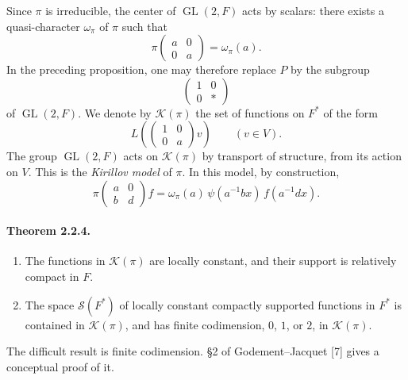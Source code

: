\documentclass[10pt,a4paper]{article}
\providecommand{\GL}{\operatorname{GL}}
\providecommand{\calK}{\mathcal K}
\begin{document}
\clearpage
{}
\hypertarget{authority-26}{}
Since \(\pi\) is irreducible, the center of \(\GL(2,F)\) acts by scalars: there exists a quasi-character \(\omega_\pi\) of \(\pi\) such that
\[
\pi\begin{pmatrix}a&0\\0&a\end{pmatrix}=\omega_\pi(a).
\]
In the preceding proposition, one may therefore replace \(P\) by the subgroup
\[
\begin{pmatrix}1&0\\0&*\end{pmatrix}
\]
of \(\GL(2,F)\). We denote by \(\calK(\pi)\) the set of functions on \(F^*\) of the form
\[
L\!\left(\begin{pmatrix}1&0\\0&a\end{pmatrix}v\right)\qquad (v\in V).
\]
The group \(\GL(2,F)\) acts on \(\calK(\pi)\) by transport of structure, from its action on \(V\). This is the \emph{Kirillov model} of \(\pi\). In this model, by construction,
\[
\tag{2.2.3.1}
\pi\begin{pmatrix}a&0\\b&d\end{pmatrix}f
=
\omega_\pi(a)\,\psi(a^{-1}bx)\,f(a^{-1}dx).
\]

\paragraph{Theorem 2.2.4.}{\itshape 
\begin{enumerate}[label=(\roman*)]
\item The functions in \(\calK(\pi)\) are locally constant, and their support is relatively compact in \(F\).
\item The space \(\mathcal S(F^*)\) of locally constant compactly supported functions in \(F^*\) is contained in \(\calK(\pi)\), and has finite codimension, \(0\), \(1\), or \(2\), in \(\calK(\pi)\).
\end{enumerate}
\par}
The difficult result is finite codimension. §2 of Godement--Jacquet [7] gives a conceptual proof of it.
\end{document}
